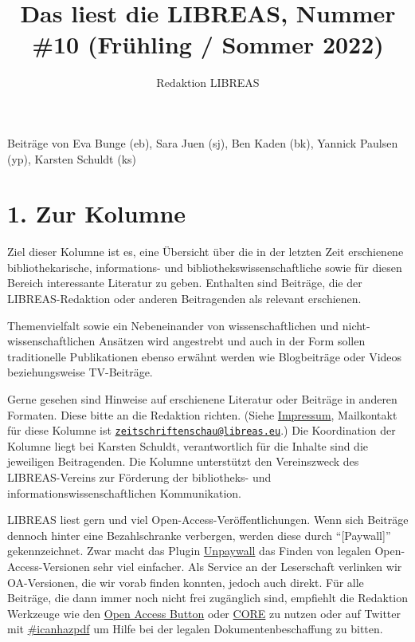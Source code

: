 \documentclass[a4paper,
fontsize=11pt,
oneside,
numbers=noperiodatend,
parskip=half-,
bibliography=totoc,
final
]{scrartcl}
\title{\LARGE{Das liest die LIBREAS, Nummer \#10 (Frühling / Sommer 2022)}}%
\author{Redaktion LIBREAS} %
\date{}
\begin{document}
\maketitle
\thispagestyle{fancyplain} 


Beiträge von Eva Bunge (eb), Sara Juen (sj), Ben Kaden (bk), Yannick
Paulsen (yp), Karsten Schuldt (ks)

\hypertarget{zur-kolumne}{%
\section{1. Zur Kolumne}\label{zur-kolumne}}

Ziel dieser Kolumne ist es, eine Übersicht über die in der letzten Zeit
erschienene bibliothekarische, informations- und
bibliothekswissenschaftliche sowie für diesen Bereich interessante
Literatur zu geben. Enthalten sind Beiträge, die der LIBREAS-Redaktion
oder anderen Beitragenden als relevant erschienen.

Themenvielfalt sowie ein Nebeneinander von wissenschaftlichen und
nicht-wissenschaftlichen Ansätzen wird angestrebt und auch in der Form
sollen traditionelle Publikationen ebenso erwähnt werden wie
Blogbeiträge oder Videos beziehungsweise TV-Beiträge.

Gerne gesehen sind Hinweise auf erschienene Literatur oder Beiträge in
anderen Formaten. Diese bitte an die Redaktion richten. (Siehe
\href{http://libreas.eu/about/}{Impressum}, Mailkontakt für diese
Kolumne ist
\href{mailto:zeitschriftenschau@libreas.eu}{\nolinkurl{zeitschriftenschau@libreas.eu}}.)
Die Koordination der Kolumne liegt bei Karsten Schuldt, verantwortlich
für die Inhalte sind die jeweiligen Beitragenden. Die Kolumne
unterstützt den Vereinszweck des LIBREAS-Vereins zur Förderung der
bibliotheks- und informationswissenschaftlichen Kommunikation.

LIBREAS liest gern und viel Open-Access-Veröffentlichungen. Wenn sich
Beiträge dennoch hinter eine Bezahlschranke verbergen, werden diese
durch \enquote{{[}Paywall{]}} gekennzeichnet. Zwar macht das Plugin
\href{http://unpaywall.org/}{Unpaywall} das Finden von legalen
Open-Access-Versionen sehr viel einfacher. Als Service an der
Leserschaft verlinken wir OA-Versionen, die wir vorab finden konnten,
jedoch auch direkt. Für alle Beiträge, die dann immer noch nicht frei
zugänglich sind, empfiehlt die Redaktion Werkzeuge wie den
\href{https://openaccessbutton.org/}{Open Access Button} oder
\href{https://core.ac.uk/services/discovery/}{CORE} zu nutzen oder auf
Twitter mit
\href{https://twitter.com/hashtag/icanhazpdf?src=hash}{\#icanhazpdf} um
Hilfe bei der legalen Dokumentenbeschaffung zu bitten.
\end{document}
